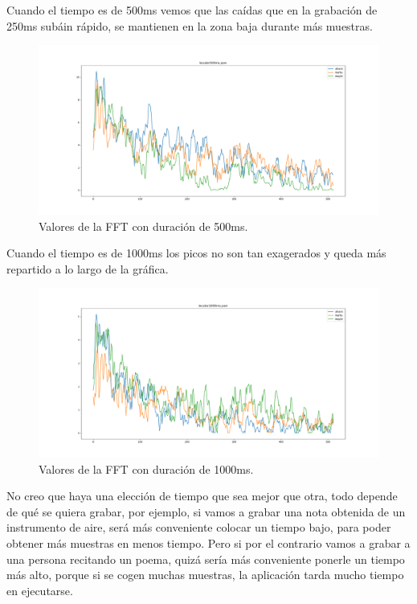 \documentclass[a4paper, 12pt]{book}
\begin{document}
Cuando el tiempo es de 500ms vemos que las caídas que en la grabación de 250ms subáin rápido, se mantienen en la zona baja durante más muestras.

\begin{figure}
	\centering
	\includegraphics[width=12cm, keepaspectratio]{img/locutor500ms.png}
	\caption{Valores de la FFT con duración de 500ms.}\label{fig:locutor500ms}
\end{figure}

Cuando el tiempo es de 1000ms los picos no son tan exagerados y queda más repartido a lo largo de la gráfica.

\begin{figure}
	\centering
	\includegraphics[width=12cm, keepaspectratio]{img/locutor1000ms.png}
	\caption{Valores de la FFT con duración de 1000ms.}\label{fig:locutor1000ms}
\end{figure}

No creo que haya una elección de tiempo que sea mejor que otra, todo depende de qué se quiera grabar, por ejemplo, si vamos a grabar una nota obtenida de un instrumento de aire, será más conveniente colocar un tiempo bajo, para poder obtener más muestras en menos tiempo. Pero si por el contrario vamos a grabar a una persona recitando un poema, quizá sería más conveniente ponerle un tiempo más alto, porque si se cogen muchas muestras, la aplicación tarda mucho tiempo en ejecutarse.
\end{document}

